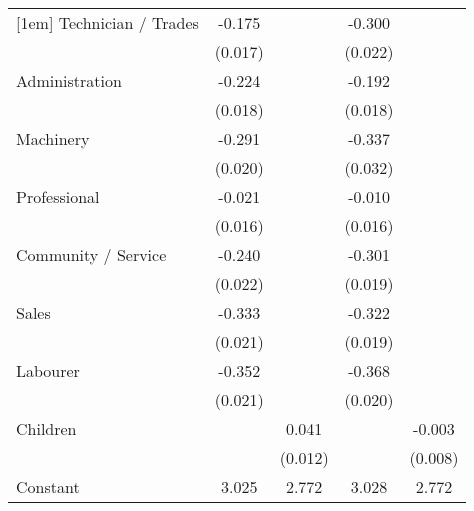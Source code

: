 {\begin{tabular}{l*{4}{c}}
[1em]
Technician / Trades &      -0.175\sym{***}&                     &      -0.300\sym{***}&                     \\
                    &     (0.017)         &                     &     (0.022)         &                     \\
[1em]
Administration      &      -0.224\sym{***}&                     &      -0.192\sym{***}&                     \\
                    &     (0.018)         &                     &     (0.018)         &                     \\
[1em]
Machinery           &      -0.291\sym{***}&                     &      -0.337\sym{***}&                     \\
                    &     (0.020)         &                     &     (0.032)         &                     \\
[1em]
Professional        &      -0.021         &                     &      -0.010         &                     \\
                    &     (0.016)         &                     &     (0.016)         &                     \\
[1em]
Community / Service &      -0.240\sym{***}&                     &      -0.301\sym{***}&                     \\
                    &     (0.022)         &                     &     (0.019)         &                     \\
[1em]
Sales               &      -0.333\sym{***}&                     &      -0.322\sym{***}&                     \\
                    &     (0.021)         &                     &     (0.019)         &                     \\
[1em]
Labourer            &      -0.352\sym{***}&                     &      -0.368\sym{***}&                     \\
                    &     (0.021)         &                     &     (0.020)         &                     \\
[1em]
Children            &                     &       0.041\sym{***}&                     &      -0.003         \\
                    &                     &     (0.012)         &                     &     (0.008)         \\
[1em]
Constant            &       3.025\sym{***}&       2.772\sym{***}&       3.028\sym{***}&       2.772\sym{***}\\

\end{tabular}}
